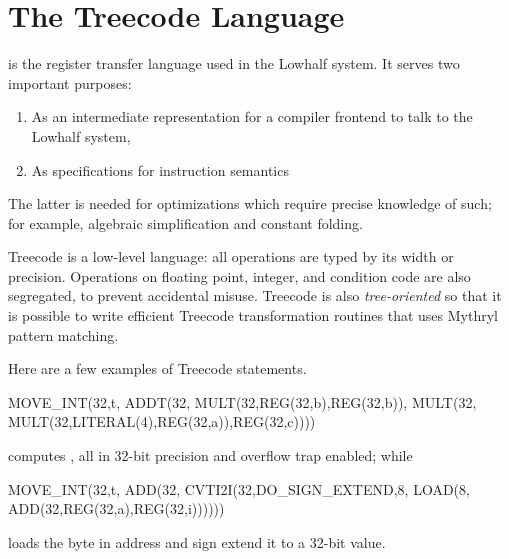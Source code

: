 \section{The Treecode Language}

 is the 
register transfer language used in the Lowhalf system.
It serves two important purposes:
\begin{enumerate}
\item As an intermediate representation for a compiler frontend 
  to talk to the Lowhalf system,
\item As specifications for instruction semantics
\end{enumerate}
The latter is needed for optimizations which require precise knowledge of such;
for example, algebraic simplification and constant folding.

Treecode is a low-level  language: 
all operations are typed by its width or precision.  
Operations on floating point, integer, and condition code 
are also segregated, to prevent accidental misuse. 
Treecode is also \emph{tree-oriented} so that it is possible to write efficient
Treecode transformation routines that uses Mythryl pattern matching.

Here are a few examples of Treecode statements.
\begin{SML}
   MOVE_INT(32,t,
      ADDT(32,
        MULT(32,REG(32,b),REG(32,b)),
        MULT(32,
          MULT(32,LITERAL(4),REG(32,a)),REG(32,c))))
\end{SML}
computes , all in 32-bit precision and overflow
trap enabled; while
\begin{SML}
   MOVE_INT(32,t,
      ADD(32,
        CVTI2I(32,DO_SIGN_EXTEND,8,
          LOAD(8,
            ADD(32,REG(32,a),REG(32,i))))))
\end{SML}
loads the byte in address  and sign extend it to a 32-bit
value. 

